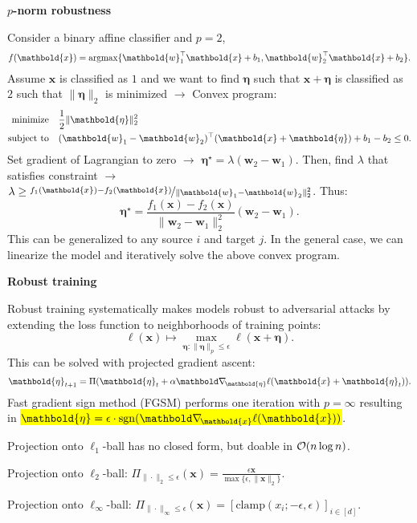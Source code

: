 \documentclass[10pt]{article}
\newenvironment{topic}[1]
{\textbf{\sffamily \footnotesize \colorbox{black}{\rlap{\textbf{\textcolor{white}{#1}}}\hspace{\linewidth}\hspace{-2\fboxsep}}}}
{}
\newenvironment{subtopic}[1]
{\begin{center}\textbf{\footnotesize \sffamily #1}\end{center}}
{}
\renewcommand{\vec}[1]{\ensuremath{\mathbold{#1}}}
\begin{document}
\begin{multicols*}{3}
\begin{topic}{Adversarial attacks}
\begin{subtopic}{$p$-norm robustness}
            Consider a binary affine classifier and $p=2$, \[
                f(\vec{x}) = \argmax \{ \transpose{\vec{w}_1} \vec{x} + b_1, \transpose{\vec{w}_2}\vec{x} + b_2 \}.
            \]
            Assume $\vec{x}$ is classified as $1$ and we want to find $\vec{\eta}$ such that $\vec{x} +
                \vec{\eta}$ is classified as $2$ such that $\| \vec{\eta} \|_2$ is minimized $\to$ Convex program:
            \begin{align*}
                \text{minimize}   & \quad \frac{1}{2} \| \vec{\eta} \|_2^2                                               \\
                \text{subject to} & \quad \transpose{(\vec{w}_1 - \vec{w}_2)} (\vec{x} + \vec{\eta}) + b_1 - b_2 \leq 0.
            \end{align*}
            Set gradient of Lagrangian to zero $\to$ $\vec{\eta}^\star = \lambda (\vec{w}_2 -
                \vec{w}_1)$. Then, find $\lambda$ that satisfies constraint $\to$ $\lambda \geq
                \nicefrac{f_1(\vec{x}) - f_2(\vec{x})}{\| \vec{w}_1 - \vec{w}_2 \|_2^2}$. Thus: \[
                \vec{\eta}^\star = \frac{f_1(\vec{x}) - f_2(\vec{x})}{\| \vec{w}_2 - \vec{w}_1 \|_2^2} (\vec{w}_2 - \vec{w}_1).
            \]
            This can be generalized to any source $i$ and target $j$. In the general case, we can linearize the
            model and iteratively solve the above convex program.
        \end{subtopic}

        \begin{subtopic}{Robust training}
            Robust training systematically makes models robust to adversarial attacks by extending the loss function to neighborhoods of training points: \[
                \ell(\vec{x}) \mapsto \max_{\vec{\eta} : \| \vec{\eta} \|_p \leq \epsilon} \ell(\vec{x} + \vec{\eta}).
            \]
            This can be solved with projected gradient ascent: \[
                \vec{\eta}_{t+1} = \Pi(\vec{\eta}_t + \alpha \grad{\ell(\vec{x} + \vec{\eta}_t)}{\vec{\eta}}).
            \]
            Fast gradient sign method (FGSM) performs one iteration with $p=\infty$ resulting in \hl{$\vec{\eta} =
            \epsilon\cdot\mathrm{sgn}(\grad{\ell(\vec{x})}{\vec{x}})$}.

                Projection onto $\ell_1$-ball has no closed form, but doable in $\bigo{n\log n}$.

            Projection onto $\ell_2$-ball: $\Pi_{\| \cdot \|_2 \leq \epsilon}(\vec{x}) = \frac{\epsilon \vec{x}}{\max \{ \epsilon, \| \vec{x} \|_2 \}}$.

            Projection onto $\ell_{\infty}$-ball: $\Pi_{\| \cdot \|_{\infty} \leq \epsilon}(\vec{x}) = [\mathrm{clamp}(x_i; -\epsilon, \epsilon)]_{i \in [d]}$.

        \end{subtopic}

    \end{topic}

\end{multicols*}
\end{document}

